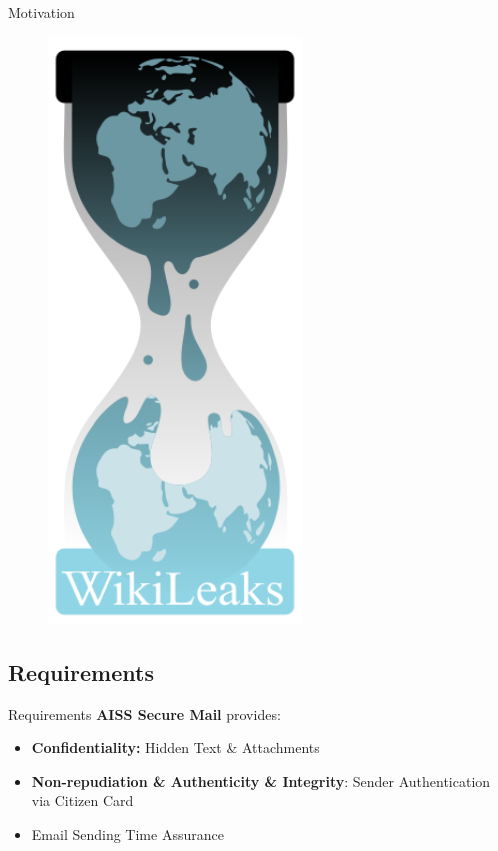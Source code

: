 \begin{frame}{Motivation}
\begin{minipage}[t]{0.7\linewidth}
\end{minipage}%
\hfill
\begin{minipage}[t]{0.3\linewidth}
 \centering
 \vspace{-1.5ex}
\begin{figure}[H]
\centering
\includegraphics[width=0.6\textwidth]{./images/wikileaks.png}
\end{figure}
\end{minipage}
   



\end{frame}


\subsection{Requirements}
\begin{frame}{Requirements}
\textbf{AISS Secure Mail}  provides: 
\begin{itemize}
\item \textbf{Confidentiality:} 
\Subitem Hidden Text \& Attachments 
\item \textbf{Non-repudiation \& Authenticity \& Integrity}: 
\Subitem  Sender Authentication via Citizen Card
\item Email Sending Time Assurance
\end{itemize}
\end{frame}

